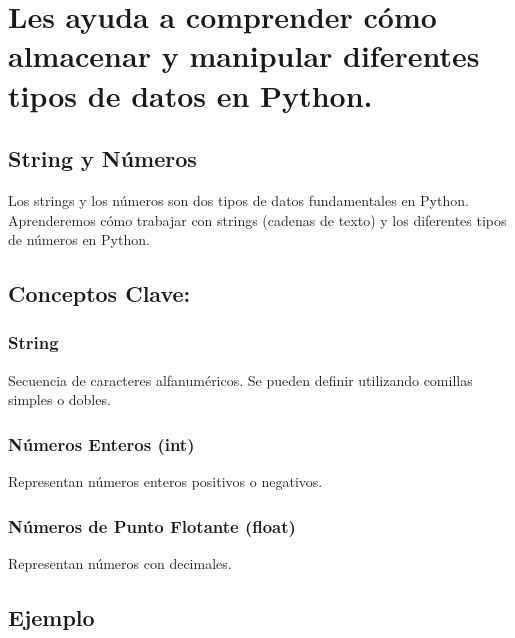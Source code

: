 \documentclass[
  a4paper,
  DIV=11,
  numbers=noendperiod,
  onepage,
  openany]{scrreprt}
\begin{document}
\hypertarget{les-ayuda-a-comprender-cuxf3mo-almacenar-y-manipular-diferentes-tipos-de-datos-en-python.}{%
\chapter{Les ayuda a comprender cómo almacenar y manipular diferentes
tipos de datos en
Python.}\label{les-ayuda-a-comprender-cuxf3mo-almacenar-y-manipular-diferentes-tipos-de-datos-en-python.}}

\hypertarget{string-y-nuxfameros-1}{%
\section{String y Números}\label{string-y-nuxfameros-1}}

Los strings y los números son dos tipos de datos fundamentales en
Python. Aprenderemos cómo trabajar con strings (cadenas de texto) y los
diferentes tipos de números en Python.

\hypertarget{conceptos-clave-17}{%
\section{Conceptos Clave:}\label{conceptos-clave-17}}

\hypertarget{string-1}{%
\subsection{String}\label{string-1}}

Secuencia de caracteres alfanuméricos. Se pueden definir utilizando
comillas simples o dobles.

\hypertarget{nuxfameros-enteros-int-1}{%
\subsection{Números Enteros (int)}\label{nuxfameros-enteros-int-1}}

Representan números enteros positivos o negativos.

\hypertarget{nuxfameros-de-punto-flotante-float-1}{%
\subsection{Números de Punto Flotante
(float)}\label{nuxfameros-de-punto-flotante-float-1}}

Representan números con decimales.

\hypertarget{ejemplo-17}{%
\section{Ejemplo}\label{ejemplo-17}}
\end{document}
